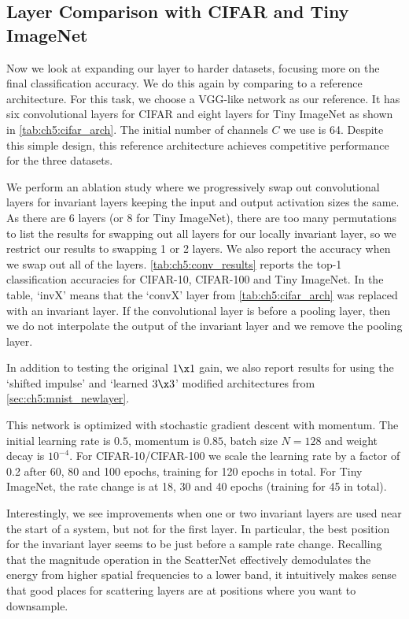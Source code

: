 

\subsection{Layer Comparison with CIFAR and Tiny ImageNet}\label{sec:conv_exp}
Now we look at expanding our layer to harder datasets, focusing more on the
final classification accuracy. We do this again by comparing to a reference
architecture. For this task, we choose a VGG-like network as our reference.
It has six convolutional layers for CIFAR and eight layers for Tiny ImageNet as shown in
\autoref{tab:ch5:cifar_arch}. The initial number of channels $C$ we use is 64. Despite
this simple design, this reference architecture achieves competitive performance
for the three datasets.

We perform an ablation study where we progressively swap out convolutional
layers for invariant layers keeping the input and output activation sizes the
same. As there are 6 layers (or 8 for Tiny ImageNet), there are too many
permutations to list the results for swapping out all layers for our locally
invariant layer, so we restrict our results to swapping 1 or 2 layers. We also
report the accuracy when we swap out all of the layers.
\autoref{tab:ch5:conv_results} reports the top-1 classification accuracies for
CIFAR-10, CIFAR-100 and Tiny ImageNet. In the table, `invX'
means that the `convX' layer from \autoref{tab:ch5:cifar_arch} was replaced with an 
invariant layer. If the convolutional layer is before a pooling layer, then we
do not interpolate the output of the invariant layer and we remove the pooling
layer. 

In addition to testing the original $1\x 1$ gain, we also report results for using 
the `shifted impulse' and `learned $3\x 3$' modified architectures from 
\autoref{sec:ch5:mnist_newlayer}. 

This network is optimized with stochastic gradient descent with momentum. The
initial learning rate is $0.5$, momentum is $0.85$, batch size $N=128$ and
weight decay is $10^{-4}$. For CIFAR-10/CIFAR-100 we scale the learning rate by
a factor of 0.2 after 60, 80 and 100 epochs, training for 120 epochs in total.
For Tiny ImageNet, the rate change is at 18, 30 and 40 epochs (training for 45 in total).



Interestingly, we see improvements when one or two invariant layers are used
near the start of a system, but not for the first layer. In particular, the best
position for the invariant layer seems to be just before a sample rate change.
Recalling that the magnitude operation in the ScatterNet effectively
demodulates the energy from higher spatial frequencies to a lower band, it
intuitively makes sense that good places for scattering layers are at
positions where you want to downsample. 

